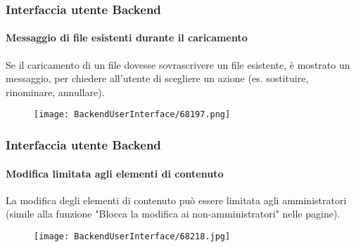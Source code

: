 \begin{frame}[fragile]
	\frametitle{Interfaccia utente Backend}
	\framesubtitle{Messaggio di file esistenti durante il caricamento}

	Se il caricamento di un file dovesse sovrascrivere un file esistente, è mostrato un messaggio,
	per chiedere all'utente di scegliere un azione (es. sostituire, rinominare, annullare).

	\begin{figure}
		\texttt{[image: BackendUserInterface/68197.png]}
	\end{figure}

\end{frame}


\begin{frame}[fragile]
	\frametitle{Interfaccia utente Backend}
	\framesubtitle{Modifica limitata agli elementi di contenuto}

	La modifica degli elementi di contenuto può essere limitata agli amministratori
	(simile alla funzione "Blocca la modifica ai non-amministratori" nelle pagine).

	\begin{figure}
		\texttt{[image: BackendUserInterface/68218.jpg]}
	\end{figure}

\end{frame}

